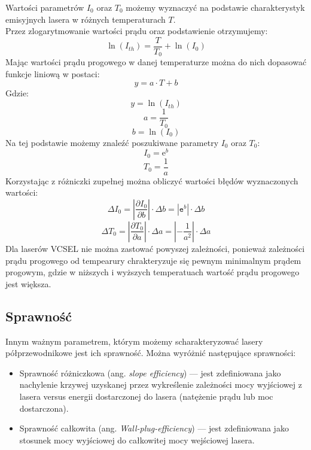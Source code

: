Wartości parametrów $I_0$ oraz $T_0$ możemy wyznaczyć na podstawie charakterystyk
emisyjnych lasera w różnych temperaturach $T$. \\
Przez zlogarytmowanie wartości prądu oraz podstawienie otrzymujemy:
\begin{equation}
\ln(I_{th}) =    \frac{T}{T_0}  + \ln(I_0)
\end{equation}
Mając wartości prądu progowego w danej temperaturze  można do nich dopasować funkcje liniową w postaci:
\begin{equation}
y = a \cdot T + b
\end{equation}
Gdzie:
\begin{equation}
y = \ln(I_{th})
\end{equation}
\begin{equation}
a = \frac{1}{T_0}
\end{equation}
\begin{equation}
b = \ln(I_0)
\end{equation}
Na tej podstawie możemy znaleźć poszukiwane parametry $I_0$ oraz $T_0$:
\begin{equation}
I_0 = \mathrm{e}^b
\end{equation}
\begin{equation}
T_0 = \frac{1}{a}
\end{equation}
Korzystając z różniczki zupełnej można obliczyć wartości błędów wyznaczonych wartości:
\begin{equation}
\Delta I_0 = \left\lvert \frac{\partial I_{0}}{\partial b} \right\rvert \cdot \Delta b = | \mathtt{e}^b | \cdot \Delta b
\end{equation}
\begin{equation}
\Delta T_0 = \left\lvert \frac{\partial T_{0}}{\partial a} \right\rvert \cdot \Delta a = \left\lvert -\frac{1}{a^2} \right\rvert \cdot \Delta a
\end{equation}
Dla laserów VCSEL nie można zastować powyszej zależności, ponieważ zależności prądu progowego od tempearury chrakteryzuje się pewnym
 minimalnym prądem progowym, gdzie w niższych i wyższych temperatuach wartość prądu progowego jest większa.
\subsection{Sprawność}
Innym ważnym parametrem, którym możemy scharakteryzować lasery półprzewodnikowe jest ich sprawność. Można wyróżnić następujące sprawności:
\begin{itemize}
\item Sprawność różniczkowa (ang. \textit{slope efficiency}) --- jest zdefiniowana jako nachylenie krzywej uzyskanej przez wykreślenie zależności mocy wyjściowej z lasera versus energii dostarczonej do lasera (natężenie prądu lub moc dostarczona).
\item Sprawność całkowita (ang. \textit{Wall-plug-efficiency}) --- jest zdefiniowana jako stosunek mocy wyjściowej do całkowitej mocy wejściowej lasera.
\end{itemize}
